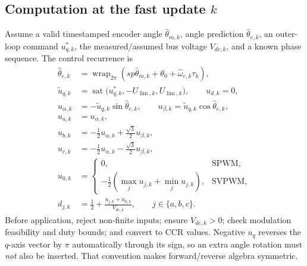 \documentclass[10pt,letterpaper]{article}
\newcommand{\wrap}{\operatorname{wrap}_{2\pi}}
\newcommand{\sat}{\operatorname{sat}}
\begin{document}
\subsection{Computation at the fast update $k$}
Assume a valid timestamped encoder angle $\hat\theta_{m,k}$, angle prediction $\hat\theta_{e,k}$, an outer-loop command $u_{q,k}^*$, the measured/assumed bus voltage $V_{dc,k}$, and a known phase sequence. The control recurrence is
\begin{align}
\hat\theta_{e,k}&=\wrap(sp\hat\theta_{m,k}+\theta_0+\hat\omega_{e,k}\tau_k),\\
\tilde u_{q,k}&=\sat\bigl(u_{q,k}^*, -U_{\lim,k},U_{\lim,k}\bigr),\qquad u_{d,k}=0,\\
u_{\alpha,k}&=-\tilde u_{q,k}\sin\hat\theta_{e,k},\qquad
u_{\beta,k}=\tilde u_{q,k}\cos\hat\theta_{e,k},\\
u_{a,k}&=u_{\alpha,k},\\
u_{b,k}&=-\frac12u_{\alpha,k}+\frac{\sqrt3}{2}u_{\beta,k},\\
u_{c,k}&=-\frac12u_{\alpha,k}-\frac{\sqrt3}{2}u_{\beta,k},\\
u_{0,k}&=\begin{cases}0,&\mathrm{SPWM},\\-\frac12(\max_j u_{j,k}+\min_j u_{j,k}),&\mathrm{SVPWM},\end{cases}\\
d_{j,k}&=\frac12+\frac{u_{j,k}+u_{0,k}}{V_{dc,k}},\qquad j\in\{a,b,c\}.
\end{align}
Before application, reject non-finite inputs; ensure $V_{dc,k}>0$; check modulation feasibility and duty bounds; and convert to CCR values. Negative $u_q$ reverses the $q$-axis vector by $\pi$ automatically through its sign, so an extra angle rotation must \emph{not} also be inserted. That convention makes forward/reverse algebra symmetric.
\end{document}

